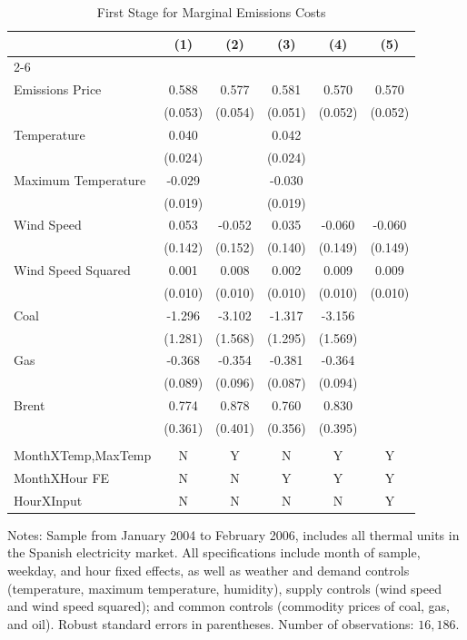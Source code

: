 \begin{table}[!ht]
\centering
\caption{First Stage for Marginal Emissions Costs} \label{tab:cost_pt_first}

\begin{tabular*}{.9\textwidth}{@{\extracolsep{\fill}} l  c  c  c  c  c }
\hline\hline 
 & \textbf{(1)}  & \textbf{(2)}  & \textbf{(3)}  & \textbf{(4)}  & \textbf{(5)} \\ \cline{2-6} \\[-\sep]
Emissions Price  & 0.588 & 0.577 & 0.581 & 0.570 & 0.570 \\ 
 & (0.053) & (0.054) & (0.051) & (0.052) & (0.052) \\[\sep] 
Temperature  & 0.040 & & 0.042 & & \\ 
 & (0.024) & & (0.024) & & \\[\sep] 
Maximum Temperature  & -0.029 & & -0.030 & & \\ 
 & (0.019) & & (0.019) & & \\[\sep] 
Wind Speed  & 0.053 & -0.052 & 0.035 & -0.060 & -0.060 \\ 
 & (0.142) & (0.152) & (0.140) & (0.149) & (0.149) \\[\sep] 
Wind Speed Squared & 0.001 & 0.008 & 0.002 & 0.009 & 0.009 \\ 
 & (0.010) & (0.010) & (0.010) & (0.010) & (0.010) \\[\sep] 
Coal  & -1.296 & -3.102 & -1.317 & -3.156 \\ 
 & (1.281) & (1.568) & (1.295) & (1.569) \\[\sep] 
Gas  & -0.368 & -0.354 & -0.381 & -0.364 \\ 
 & (0.089) & (0.096) & (0.087) & (0.094) \\[\sep] 
Brent  & 0.774 & 0.878 & 0.760 & 0.830 \\ 
 & (0.361) & (0.401) & (0.356) & (0.395) \\[\sep]\hline\\[-\sep]
MonthXTemp,MaxTemp     & N & Y & N & Y & Y  \\
MonthXHour FE          & N & N & Y & Y & Y  \\
HourXInput                     & N & N & N & N & Y  \\[\sep]
\hline\hline 
\end{tabular*}
\begin{minipage}[c]{.9\textwidth}
{\footnotesize 
\noindent
Notes: Sample from January 2004 to February 2006, includes all thermal units in the Spanish electricity market. 
All specifications include month of sample, weekday, and hour fixed effects, as well as weather and demand controls 
(temperature, maximum temperature, humidity), 
 supply controls (wind speed and wind speed squared); and common controls (commodity prices of 
coal, gas, and oil). 
Robust standard errors in parentheses. Number of observations: $ 16,186$.}
\end{minipage}
\end{table}
